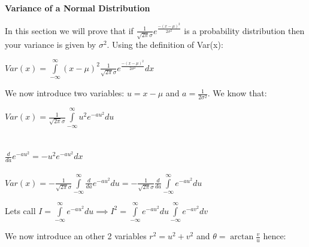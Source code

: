 \documentclass[paper=9in:6in,pagesize=pdftex,headinclude=on,footinclude=on,10pt,bibtotoc,pointlessnumbers,normalheadings,DIV=9,twoside=false]{scrbook}
\begin{document}
\date{}


\begin{large} 
 \textbf{Variance of a Normal Distribution \\}
\end{large} 

\begin{text}
In this section we will prove that if $\frac{1}{\sqrt{2\pi}\sigma}  e^{\frac{-(x-\mu)^2}{2\sigma^2}} $ is a probability distribution then your variance is given by $\sigma^2$. Using the definition of Var(x):\\
\end{text}

\begin{center}
    $Var(x) = \int\limits_{-\infty}^{\infty} (x-\mu)^2 \frac{1}{\sqrt{2\pi}\sigma}  e^{\frac{-(x-\mu)^2}{2\sigma^2}}dx $
\end{center}

\begin{text}
We now introduce two variables: $u=x-\mu$ and $a=\frac{1}{2\sigma^2}$. We know that:
\end{text}

\begin{center}
     $Var(x) = \frac{1}{\sqrt{2\pi}\sigma} \int\limits_{-\infty}^{\infty} u^2   e^{-au^2} du $ \ \\
     \ \\
     \ \\
     $\frac{d}{da} e^{-au^2} = -u^2   e^{-au^2} dx $ \\ 
     \ \\
     
     $Var(x) = -\frac{1}{\sqrt{2\pi}\sigma} \int\limits_{-\infty}^{\infty} \frac{d}{da} e^{-au^2} du =-  \frac{1}{\sqrt{2\pi}\sigma} \frac{d}{da} \int\limits_{-\infty}^{\infty} e^{-au^2} du $ \\
\end{center}

\begin{center}
Lets call $I = \int\limits_{-\infty}^{\infty} e^{-au^2} du \implies I^2 = \int\limits_{-\infty}^{\infty} e^{-au^2} du \int\limits_{-\infty}^{\infty} e^{-av^2} dv $  \\
\end{center}

\begin{text}
We now introduce an other 2 variables $r^2=u^2+v^2$ and $\theta = \arctan \frac{v}{u}$ hence: \\ 
\end{text}
\end{document}
